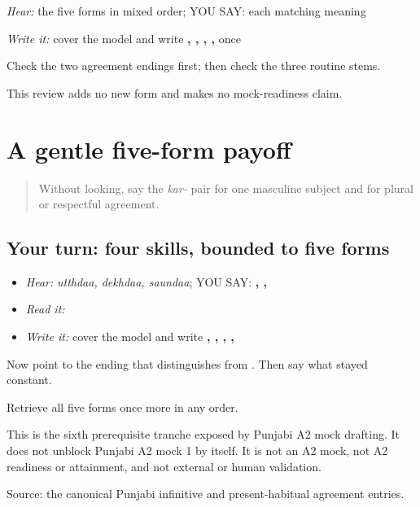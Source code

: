\emph{Hear:} the five forms in mixed order; YOU SAY: each matching meaning

\begin{tcolorbox}[breakable,colback=teal!4,colframe=teal!35!black,title={Before you move on}]
\emph{Write it:} cover the model and write \textbf{, , , , } once

Check the two agreement endings first; then check the three routine stems.

This review adds no new form and makes no mock-readiness claim.
\end{tcolorbox}
\section[\texorpdfstring{\pa{ਕਰਦਾ}, \pa{ਕਰਦੇ}, \pa{ਉੱਠਦਾ} … (kardaa, karde …)}{ਕਰਦਾ, ਕਰਦੇ, ਉੱਠਦਾ … (kardaa, karde …)}]{A gentle five-form payoff}

\label{lesson:PA-C183-payoff}



\begin{quote}
Without looking, say the \emph{kar-} pair for one masculine subject and for plural or respectful agreement.
\end{quote}

\subsection*{Your turn: four skills, bounded to five forms}
\begin{itemize}
\raggedright
  \item \emph{Hear:} \emph{utthdaa, dekhdaa, saundaa}; YOU SAY: \textbf{, , }
  \item \emph{Read it:} \textbf{       }
  \item \emph{Write it:} cover the model and write \textbf{, , , , }
\end{itemize}

Now point to the ending that distinguishes \textbf{} from \textbf{}. Then say what stayed constant.

\begin{tcolorbox}[breakable,colback=teal!4,colframe=teal!35!black,title={Before you move on}]
Retrieve all five forms once more in any order.

This is the sixth prerequisite tranche exposed by Punjabi A2 mock drafting. It does not unblock Punjabi A2 mock 1 by itself. It is not an A2 mock, not A2 readiness or attainment, and not external or human validation.

Source: the canonical Punjabi infinitive and present-habitual agreement entries.
\end{tcolorbox}
